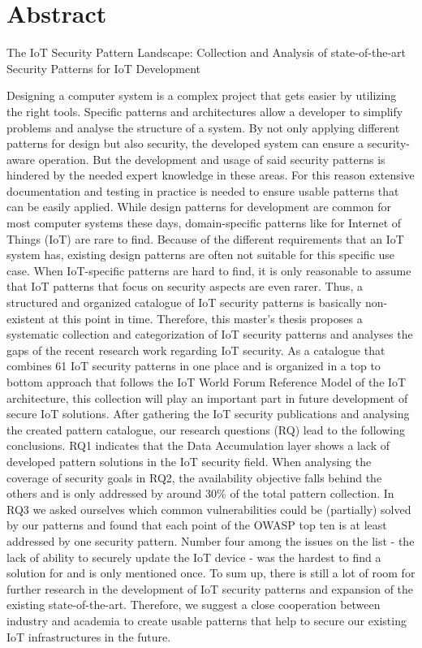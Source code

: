 
\thispagestyle{plain}

\section*{Abstract}
The IoT Security Pattern Landscape: Collection and Analysis of state-of-the-art Security Patterns for IoT Development

Designing a computer system is a complex project that gets easier by utilizing the right tools. Specific patterns and architectures allow a developer to simplify problems and analyse the structure of a system. By not only applying different patterns for design but also security, the developed system can ensure a security-aware operation. But the development and usage of said security patterns is hindered by the needed expert knowledge in these areas. For this reason extensive documentation and testing in practice is needed to ensure usable patterns that can be easily applied. While design patterns for development are common for most computer systems these days, domain-specific patterns like for Internet of Things (IoT) are rare to find. Because of the different requirements that an IoT system has, existing design patterns are often not suitable for this specific use case. When IoT-specific patterns are hard to find, it is only reasonable to assume that IoT patterns that focus on security aspects are even rarer. Thus, a structured and organized catalogue of IoT security patterns is basically non-existent at this point in time. Therefore, this master's thesis proposes a systematic collection and categorization of IoT security patterns and analyses the gaps of the recent research work regarding IoT security. As a catalogue that combines 61 IoT security patterns in one place and is organized in a top to bottom approach that follows the IoT World Forum Reference Model of the IoT architecture, this collection will play an important part in future development of secure IoT solutions. After gathering the IoT security publications and analysing the created pattern catalogue, our research questions (RQ) lead to the following conclusions. RQ1 indicates that the Data Accumulation layer shows a lack of developed pattern solutions in the IoT security field. When analysing the coverage of security goals in RQ2, the availability objective falls behind the others and is only addressed by around 30\% of the total pattern collection. In RQ3 we asked ourselves which common vulnerabilities could be (partially) solved by our patterns and found that each point of the OWASP top ten is at least addressed by one security pattern. Number four among the issues on the list - the lack of ability to securely update the IoT device - was the hardest to find a solution for and is only mentioned once. To sum up, there is still a lot of room for further research in the development of IoT security patterns and expansion of the existing state-of-the-art. Therefore, we suggest a close cooperation between industry and academia to create usable patterns that help to secure our existing IoT infrastructures in the future. 